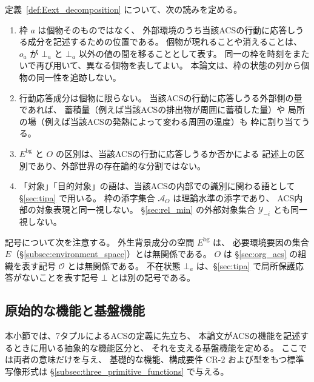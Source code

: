 \begin{remark}[枠と行動応答成分の読み]
\label{rem:Eext_decomposition_reading}
定義~\ref{def:Eext_decomposition} について、次の読みを定める。
\begin{enumerate}[label=(\alph*)]
  \item 枠 $a$ は個物そのものではなく、
  外部環境のうち当該ACSの行動に応答しうる成分を記述するための位置である。
  個物が現れることや消えることは、
  $o_a$ が $\bot_a$ と $\bot_a$ 以外の値の間を移ることとして表す。
  同一の枠を時刻をまたいで再び用いて、異なる個物を表してよい。
  本論文は、枠の状態の列から個物の同一性を追跡しない。
  \item 行動応答成分は個物に限らない。
  当該ACSの行動に応答しうる外部側の量であれば、
  蓄積量（例えば当該ACSの排出物が周囲に蓄積した量）や
  局所の場（例えば当該ACSの発熱によって変わる周囲の温度）も
  枠に割り当てうる。
  \item $E^{\mathrm{bg}}$ と $O$ の区別は、当該ACSの行動に応答しうるか否かによる
  記述上の区別であり、外部世界の存在論的な分割ではない。
  \item 「対象」「目的対象」の語は、当該ACSの内部での識別に関わる語として
  \S\ref{sec:tipa} で用いる。
  枠の添字集合 $\mathcal A_O$ は理論水準の添字であり、
  ACS内部の対象表現と同一視しない。
  \S\ref{sec:rel_min} の外部対象集合 $\mathcal Y_{-i}$ とも同一視しない。
\end{enumerate}
記号について次を注意する。
外生背景成分の空間 $E^{\mathrm{bg}}$ は、
必要環境要因の集合 $E$（\S\ref{subsec:environment_space}）とは無関係である。
$O$ は \S\ref{sec:org_acs} の組織を表す記号 $\mathcal O$ とは無関係である。
不在状態 $\bot_a$ は、\S\ref{sec:tipa} で局所保護応答がないことを表す記号 $\bot$ とは別の記号である。
\end{remark}

\subsection{原始的な機能と基盤機能}
\label{subsec:primitive_functions}

本小節では、7タプルによるACSの定義に先立ち、
本論文がACSの機能を記述するときに用いる抽象的な機能区分と、
それを支える基盤機能を定める。
ここでは両者の意味だけを与え、
基礎的な機能、構成要件 CR-2 および型をもつ標準写像形式は
\S\ref{subsec:three_primitive_functions} で与える。

